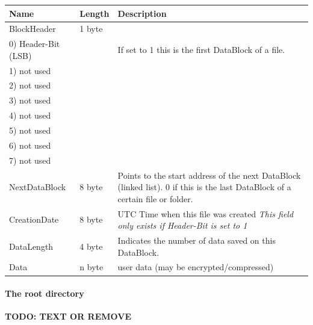 \begin{tabular}{|l|l|p{5cm}|}
\hline
\textbf{Name} & \textbf{Length} & \textbf{Description}
\\  \hline
BlockHeader & 1 byte &
\\
\hspace{0.2cm} 0) Header-Bit (LSB) & &  If set to 1 this is the first DataBlock
of a file.
\\
\hspace{0.2cm} 1) not used & &
\\
\hspace{0.2cm} 2) not used & &
\\
\hspace{0.2cm} 3) not used & &
\\
\hspace{0.2cm} 4) not used & &
\\
\hspace{0.2cm} 5) not used & &
\\
\hspace{0.2cm} 6) not used & &
\\
\hspace{0.2cm} 7) not used & &

\\  \hline
NextDataBlock & 8 byte &
Points to the start address of the next DataBlock (linked list).
0 if this is the last DataBlock of a certain file or folder.
\\  \hline
CreationDate & 8 byte & UTC Time when this file was created
\newline \textit{This field only exists if Header-Bit is set to 1}
\\  \hline

DataLength & 4 byte &
Indicates the number of data saved on this DataBlock.

\\  \hline
Data & n byte & user data (may be encrypted/compressed)
\\  \hline
\end{tabular}


\paragraph{The root directory}
\textbf{TODO: TEXT OR REMOVE}
